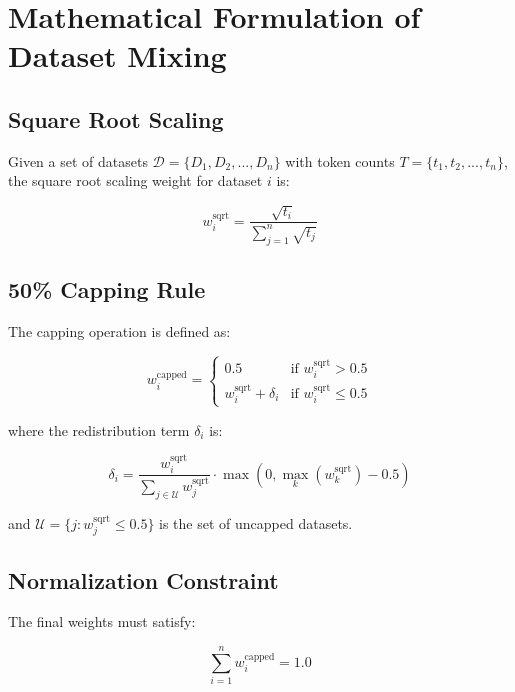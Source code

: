 \documentclass{article}
\begin{document}
\section{Mathematical Formulation of Dataset Mixing}

\subsection{Square Root Scaling}

Given a set of datasets $\mathcal{D} = \{D_1, D_2, ..., D_n\}$ with token counts $T = \{t_1, t_2, ..., t_n\}$, the square root scaling weight for dataset $i$ is:

\begin{equation}
w_i^{\text{sqrt}} = \frac{\sqrt{t_i}}{\sum_{j=1}^{n} \sqrt{t_j}}
\end{equation}

\subsection{50\% Capping Rule}

The capping operation is defined as:

\begin{equation}
w_i^{\text{capped}} =
\begin{cases}
0.5 & \text{if } w_i^{\text{sqrt}} > 0.5 \\
w_i^{\text{sqrt}} + \delta_i & \text{if } w_i^{\text{sqrt}} \leq 0.5
\end{cases}
\end{equation}

where the redistribution term $\delta_i$ is:

\begin{equation}
\delta_i = \frac{w_i^{\text{sqrt}}}{\sum_{j \in \mathcal{U}} w_j^{\text{sqrt}}} \cdot \max(0, \max_k(w_k^{\text{sqrt}}) - 0.5)
\end{equation}

and $\mathcal{U} = \{j : w_j^{\text{sqrt}} \leq 0.5\}$ is the set of uncapped datasets.

\subsection{Normalization Constraint}

The final weights must satisfy:

\begin{equation}
\sum_{i=1}^{n} w_i^{\text{capped}} = 1.0
\end{equation}
\end{document}
